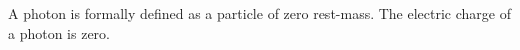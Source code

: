 A photon is formally defined as a particle of zero rest-mass. The electric charge of a photon is zero.

